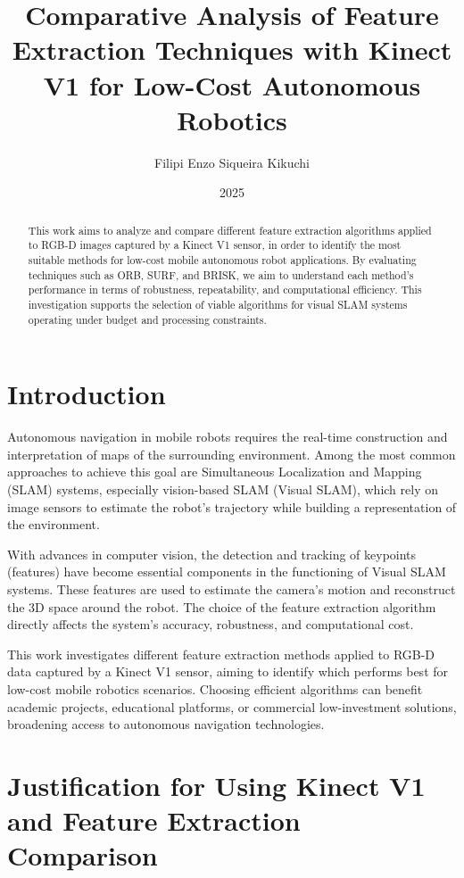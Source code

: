 \documentclass[a4paper,12pt]{article}
\title{Comparative Analysis of Feature Extraction Techniques with Kinect V1 for Low-Cost Autonomous Robotics}
\author{Filipi Enzo Siqueira Kikuchi}
\date{2025}
\begin{document}
\maketitle

\begin{abstract}
This work aims to analyze and compare different feature extraction algorithms applied to RGB-D images captured by a Kinect V1 sensor, in order to identify the most suitable methods for low-cost mobile autonomous robot applications. By evaluating techniques such as ORB, SURF, and BRISK, we aim to understand each method’s performance in terms of robustness, repeatability, and computational efficiency. This investigation supports the selection of viable algorithms for visual SLAM systems operating under budget and processing constraints.
\end{abstract}

\section{Introduction}

Autonomous navigation in mobile robots requires the real-time construction and interpretation of maps of the surrounding environment. Among the most common approaches to achieve this goal are Simultaneous Localization and Mapping (SLAM) systems, especially vision-based SLAM (Visual SLAM), which rely on image sensors to estimate the robot’s trajectory while building a representation of the environment.

With advances in computer vision, the detection and tracking of keypoints (features) have become essential components in the functioning of Visual SLAM systems. These features are used to estimate the camera’s motion and reconstruct the 3D space around the robot. The choice of the feature extraction algorithm directly affects the system’s accuracy, robustness, and computational cost.

This work investigates different feature extraction methods applied to RGB-D data captured by a Kinect V1 sensor, aiming to identify which performs best for low-cost mobile robotics scenarios. Choosing efficient algorithms can benefit academic projects, educational platforms, or commercial low-investment solutions, broadening access to autonomous navigation technologies.

\section{Justification for Using Kinect V1 and Feature Extraction Comparison}
\end{document}
